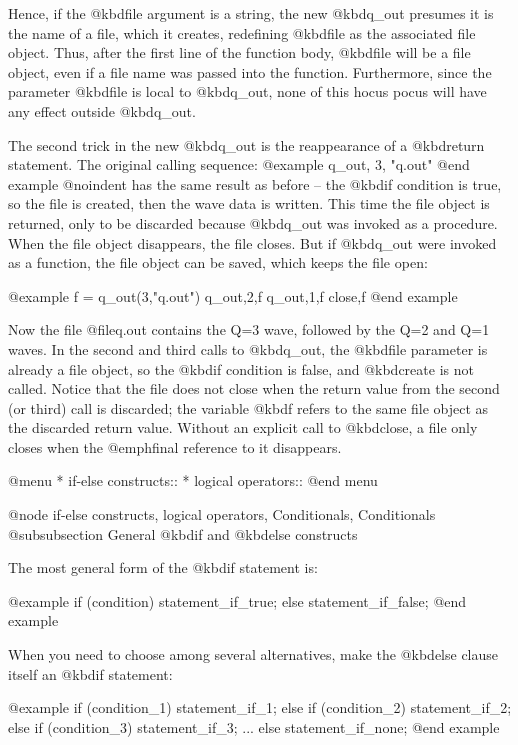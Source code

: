 {Hence, if the @kbd{file} argument is a string, the new @kbd{q_out}
presumes it is the name of a file, which it creates, redefining
@kbd{file} as the associated file object.  Thus, after the first line
of the function body, @kbd{file} will be a file object, even if a file
name was passed into the function.  Furthermore, since the parameter
@kbd{file} is local to @kbd{q_out}, none of this hocus pocus will have
any effect outside @kbd{q_out}.

The second trick in the new @kbd{q_out} is the reappearance of a
@kbd{return} statement.  The original calling sequence:
@example
q_out, 3, "q.out"
@end example
@noindent
has the same result as before -- the @kbd{if} condition is true, so
the file is created, then the wave data is written.  This time the
file object is returned, only to be discarded because @kbd{q_out}
was invoked as a procedure.  When the file object disappears, the
file closes.  But if @kbd{q_out} were invoked as a function, the file
object can be saved, which keeps the file open:

@example
f = q_out(3,"q.out")
q_out,2,f
q_out,1,f
close,f
@end example

Now the file @file{q.out} contains the Q=3 wave, followed by the Q=2
and Q=1 waves.  In the second and third calls to @kbd{q_out}, the
@kbd{file} parameter is already a file object, so the @kbd{if}
condition is false, and @kbd{create} is not called.  Notice that the
file does not close when the return value from the second (or third)
call is discarded; the variable @kbd{f} refers to the same file object
as the discarded return value.  Without an explicit call to
@kbd{close}, a file only closes when the @emph{final} reference to it
disappears.


@menu
* if-else constructs::          
* logical operators::           
@end menu

@node if-else constructs, logical operators, Conditionals, Conditionals
@subsubsection General @kbd{if} and @kbd{else} constructs

The most general form of the @kbd{if} statement is:

@example
if (condition) statement_if_true;
else statement_if_false;
@end example

When you need to choose among several alternatives, make the @kbd{else}
clause itself an @kbd{if} statement:

@example
if (condition_1) statement_if_1;
else if (condition_2) statement_if_2;
else if (condition_3) statement_if_3;
...
else statement_if_none;
@end example

}
